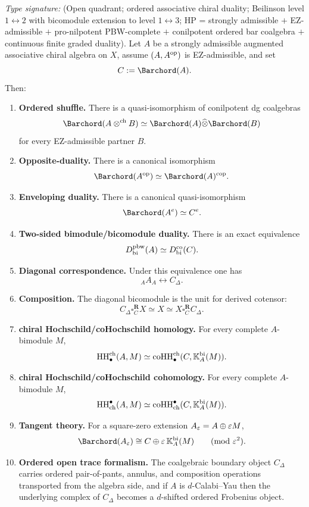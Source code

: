 \begin{theorem}
\ClaimStatusProvedHere
\label{thm:master}
\emph{Type signature:} (Open quadrant; ordered associative chiral
duality; Beilinson level $1\!\leftrightarrow\!2$ with bicomodule
extension to level $1\!\leftrightarrow\!3$; HP = strongly admissible
$+$ EZ-admissible $+$ pro-nilpotent PBW-complete $+$ conilpotent
ordered bar coalgebra $+$ continuous finite graded duality).
Let $A$ be a strongly admissible augmented associative chiral algebra on $X$, assume
$(A,A^{\mathrm{op}})$ is EZ-admissible, and set
\[
C:=\Barchord(A).
\]
Then:
\begin{enumerate}[label=(\arabic*)]
\item \textbf{Ordered shuffle.}
There is a quasi-isomorphism of conilpotent dg coalgebras
\[
\Barchord(A\chotimes B)\simeq \Barchord(A)\widehat\otimes \Barchord(B)
\]
for every EZ-admissible partner $B$.

\item \textbf{Opposite-duality.}
There is a canonical isomorphism
\[
\Barchord(A^{\op})\simeq \Barchord(A)^{\cop}.
\]

\item \textbf{Enveloping duality.}
There is a canonical quasi-isomorphism
\[
\Barchord(A^e)\simeq C^e.
\]

\item \textbf{Two-sided bimodule/bicomodule duality.}
There is an exact equivalence
\[
D^{\mathrm{pbw}}_{\mathrm{bi}}(A)\simeq D^{\mathrm{co}}_{\mathrm{bi}}(C).
\]

\item \textbf{Diagonal correspondence.}
Under this equivalence one has
\[
{}_A A_A \longleftrightarrow C_\Delta.
\]

\item \textbf{Composition.}
The diagonal bicomodule is the unit for derived cotensor:
\[
C_\Delta\square_C^{\mathbf R} X\simeq X\simeq X\square_C^{\mathbf R}C_\Delta.
\]

\item \textbf{chiral Hochschild/coHochschild homology.}
For every complete $A$-bimodule $M$,
\[
\operatorname{HH}^{\mathrm{ch}}_\bullet(A,M)
\simeq
\operatorname{coHH}^{\mathrm{ch}}_\bullet(C,\mathbb{K}_A^{\mathrm{bi}}(M)).
\]

\item \textbf{chiral Hochschild/coHochschild cohomology.}
For every complete $A$-bimodule $M$,
\[
\operatorname{HH}_{\mathrm{ch}}^\bullet(A,M)
\simeq
\operatorname{coHH}_{\mathrm{ch}}^\bullet(C,\mathbb{K}_A^{\mathrm{bi}}(M)).
\]

\item \textbf{Tangent theory.}
For a square-zero extension $A_\varepsilon=A\oplus \varepsilon M$,
\[
\Barchord(A_\eps)\cong C\oplus \eps\,\KK_A^{\mathrm{bi}}(M)\qquad (\mathrm{mod}\ \eps^2).
\]

\item \textbf{Ordered open trace formalism.}
The coalgebraic boundary object $C_\Delta$ carries ordered pair-of-pants, annulus, and composition
operations transported from the algebra side, and if $A$ is $d$-Calabi--Yau then the underlying
complex of $C_\Delta$ becomes a $d$-shifted ordered Frobenius object.
\end{enumerate}
\end{theorem}

